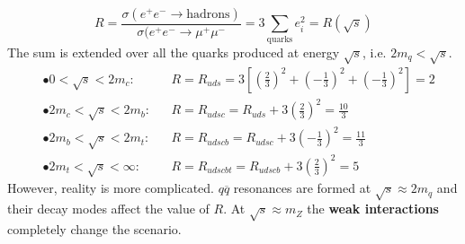 \documentclass[10.75pt,a4paper,openright,bottom=2cm]{article}
\begin{document}
\[
R=\frac{\sigma(e^+e^-\to\text{hadrons})}{\sigma(e^+e^-\to\mu^+\mu^-}=3\sum_{\text{quarks}}e_i^2=R(\sqrt{s})
\]
The sum is extended over all the quarks produced at energy $\sqrt{s}$, i.e. $2m_q<\sqrt{s}$.
\[
\begin{aligned}
&\bullet 0<\sqrt{s}<2m_c: &&R=R_{uds}=3\left[\left(\frac{2}{3}\right)^2+\left(-\frac{1}{3}\right)^2+\left(-\frac{1}{3}\right)^2\right]=2\\
&\bullet 2m_c<\sqrt{s}<2m_b: &&R=R_{udsc}=R_{uds}+3\left(\frac{2}{3}\right)^2=\frac{10}{3}\\
&\bullet 2m_b<\sqrt{s}<2m_t: &&R=R_{udscb}=R_{udsc}+3\left(-\frac{1}{3}\right)^2=\frac{11}{3}\\
&\bullet 2m_t<\sqrt{s}<\infty: &&R=R_{udscbt}=R_{udscb}+3\left(\frac{2}{3}\right)^2=5
\end{aligned}
\]
However, reality is more complicated. $q\overline{q}$ resonances are formed at $\sqrt{s}\approx2m_q$ and their decay modes affect the value of $R$. At $\sqrt{s}\approx m_Z$ the \textbf{weak interactions} completely change the scenario.
\end{document}
